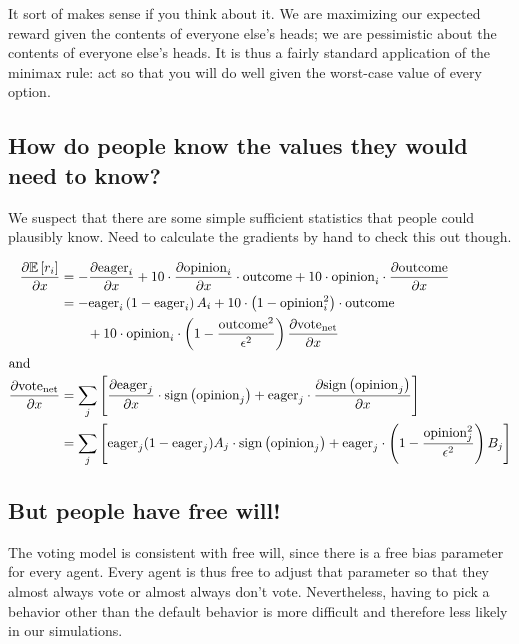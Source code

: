 \documentclass{article}
\begin{document}
It sort of makes sense if you think about it. We are maximizing our expected
reward given the contents of everyone else's heads; we are pessimistic about
the contents of everyone else's heads. It is thus a fairly standard application
of the minimax rule: act so that you will do well given the worst-case value of
every option.

\subsection{How do people know the values they would need to know?}

We suspect that there are some simple sufficient statistics that people could
plausibly know. Need to calculate the gradients by hand to check this out
though.

\begin{align*}
\frac{\partial \mathbb{E}\left[ r_i \right]}{\partial x} &=
-\frac{\partial \mathrm{eager}_i}{\partial x} + 10 \cdot \frac{\partial \mathrm{opinion}_i}{\partial x} \cdot \mathrm{outcome} + 10 \cdot \mathrm{opinion}_i \cdot \frac{\partial \mathrm{outcome}}{\partial x} \\
&= -\mathrm{eager}_i \left(1 - \mathrm{eager}_i \right) A_i +
10 \cdot \left( 1 - \mathrm{opinion}_i ^ 2 \right) \cdot \mathrm{outcome} \\
& \qquad + 10 \cdot \mathrm{opinion}_i \cdot \left(1 - \frac{\mathrm{outcome}^2}{\epsilon^2} \right) 
\frac{\partial \mathrm{vote}_\mathrm{net}}{\partial x}\\
\intertext{and}
\frac{\partial \mathrm{vote}_\mathrm{net}}{\partial x} &= 
\sum_j \left[ \frac{\partial \mathrm{eager}_j}{\partial x} \cdot \mathrm{sign} \left(\mathrm{opinion}_j\right) +
\mathrm{eager}_j \cdot \frac{\partial \mathrm{sign} \left(\mathrm{opinion}_j\right)}{\partial x} \right] \\
&= \sum_j \left[ \mathrm{eager}_j (1 - \mathrm{eager}_j) A_j \cdot \mathrm{sign} \left(\mathrm{opinion}_j\right) +
\mathrm{eager}_j \cdot \left(1 - \frac{\mathrm{opinion}_j^2}{\epsilon^2}\right) B_j \right] \\
\end{align*}

\subsection{But people have free will!}

The voting model is consistent with free will, since there is a free bias
parameter for every agent. Every agent is thus free to adjust that parameter so
that they almost always vote or almost always don't vote. Nevertheless, having
to pick a behavior other than the default behavior is more difficult and
therefore less likely in our simulations.
\end{document}

